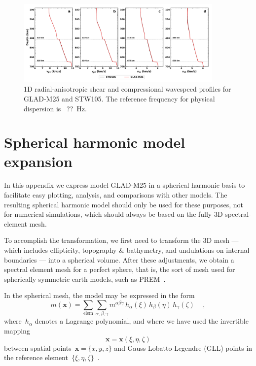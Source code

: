 \documentclass[extra,mreferee]{gji}
\begin{document}
\begin{figure}
  \centering
  \includegraphics[width=0.9\textwidth]{figures/1d_profile_ra.pdf}
  \caption{1D radial-anisotropic shear and compressional wavespeed profiles for GLAD-M25 and STW105. The reference frequency for physical dispersion is~{\color{red} ??}~Hz.}
  \label{fig:global-ra-average}
\end{figure}

\section{Spherical harmonic model expansion}
\label{sec:shanalysis}

In this appendix we express model GLAD-M25 in a spherical harmonic basis
to facilitate easy plotting, analysis, and comparisons with other models.
The resulting spherical harmonic model should only be used for these purposes, not for numerical simulations, which should always be based on the fully 3D spectral-element mesh.

To accomplish the transformation,
we first need to transform the 3D mesh --- which includes ellipticity, topography \& bathymetry, and undulations on internal boundaries --- into a spherical volume.
After these adjustments, we obtain a spectral element mesh for a perfect sphere,
that is, the sort of mesh used for spherically symmetric earth models, such as PREM~\citep{PREM}.

In the spherical mesh, the model may be expressed in the form
\begin{equation}
    m(\mathbf{x})=\sum_{\mathrm{elem}}\sum_{\alpha,\beta,\gamma}m^{\alpha\beta\gamma}\,h_{\alpha}(\xi)\,h_{\beta}(\eta)\,h_{\gamma}(\zeta)\,
    \quad ,
\end{equation}
where~$h_\alpha$ denotes a Lagrange polynomial, and where we have used the invertible mapping
\begin{equation}
    \mathbf{x}=\mathbf{x}(\xi,\eta,\zeta)
    \label{eq:map}
\end{equation}
between spatial points~$\mathbf{x}=\{x,y,z\}$ and Gauss-Lobatto-Legendre (GLL) points in the reference element~$\{\xi,\eta,\zeta\}$~\citep{KoTr99}.
\end{document}
